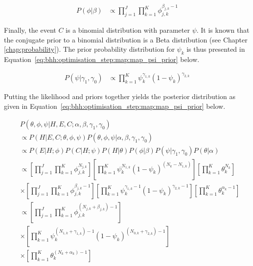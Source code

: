 \begin{equation}
      \label{eq:bhh:optimisation_step:map:map_phi_prior}
      \begin{split}
            P(\phi \vert \beta)
            &\propto \prod_{j=1}^{J}  \prod_{k=1}^{K} \phi_{j,k}^{\beta_{j,k} -1}
      \end{split}
\end{equation}

Finally, the event $C$ is a binomial distribution with parameter $\psi$. It is known that the conjugate prior to a binomial distribution is a Beta distribution (see Chapter \ref{chap:probability}). The prior probability distribution for $\psi_{k}$ is thus presented in Equation~\eqref{eq:bhh:optimisation_step:map:map_psi_prior} below.

\begin{equation}
      \label{eq:bhh:optimisation_step:map:map_psi_prior}
      \begin{split}
            P(\psi | \gamma_{1}, \gamma_{0})
            &\propto \prod_{k=1}^{K} \psi_{k}^{\gamma_{1,k}} (1- \psi_{k})^{\gamma_{2,k}}
      \end{split}
\end{equation}

Putting the likelihood and priors together yields the posterior distribution as given in Equation~\eqref{eq:bhh:optimisation_step:map:map_psi_prior} below.

\begin{equation}
      \label{eq:bhh:optimisation_step:map:posterior}
      \begin{split}
            & P(\theta, \phi, \psi \vert H, E, C;  \alpha, \beta, \gamma_{1}, \gamma_{0}) \\
            &\propto P(H \vert E, C; \theta, \phi, \psi)P(\theta, \phi, \psi \vert \alpha, \beta, \gamma_{1}, \gamma_{0}) \\
            &\propto P(E \vert H; \phi) P(C \vert H; \psi) P(H \vert \theta) P(\phi \vert \beta) P(\psi \vert \gamma_{1}, \gamma_{0}) P(\theta \vert \alpha)  \\
            &\propto \left[ \prod_{j=1}^{J} \prod_{k=1}^{K} \phi_{j,k}^{N_{j,k}} \right] \left[ \prod_{k=1}^{K} \psi_{k}^{N_{1,k}} (1 - \psi_{k})^{(N_{k} - N_{1,k})} \right] \left[ \prod_{k=1}^{K} \theta_{k}^{N_{k}} \right] \\
            &\times \left[ \prod_{j=1}^{J} \prod_{k=1}^{K} \phi_{j,k}^{\beta_{j,k} - 1} \right] \left[ \prod_{k=1}^{K} \psi_{k}^{\gamma_{1,k} - 1} (1 - \psi_{k})^{\gamma_{2,k} - 1} \right] \left[ \prod_{k=1}^{K} \theta_{k}^{\alpha_{k} - 1} \right] \\
            &\propto \left[ \prod_{j=1}^{J} \prod_{k=1}^{K} \phi_{j,k}^{(N_{j,k} + \beta_{j,k}) - 1} \right] \\
            &\times \left[ \prod_{k=1}^{K} \psi_{k}^{(N_{1,k} + \gamma_{1,k}) - 1} (1 - \psi_{k})^{(N_{0,k} + \gamma_{2,k} )- 1} \right] \\
            &\times \left[ \prod_{k=1}^{K} \theta_{k}^{(N_{k} + \alpha_{k}) - 1} \right]
      \end{split}
\end{equation}


